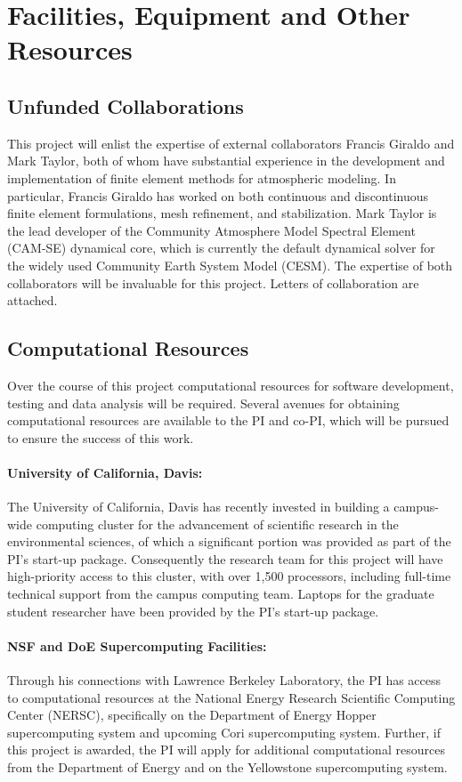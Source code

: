 \documentclass[11pt]{article}
\begin{document}
\appendix

\setcounter{section}{8}

\section{Facilities, Equipment and Other Resources}

\subsection{Unfunded Collaborations}

This project will enlist the expertise of external collaborators Francis Giraldo and Mark Taylor, both of whom have substantial experience in the development and implementation of finite element methods for atmospheric modeling.  In particular, Francis Giraldo has worked on both continuous and discontinuous finite element formulations, mesh refinement, and stabilization.  Mark Taylor is the lead developer of the Community Atmosphere Model Spectral Element (CAM-SE) dynamical core, which is currently the default dynamical solver for the widely used Community Earth System Model (CESM).  The expertise of both collaborators will be invaluable for this project.  Letters of collaboration are attached.

\subsection{Computational Resources}

Over the course of this project computational resources for software development, testing and data analysis will be required.  Several avenues for obtaining computational resources are available to the PI and co-PI, which will be pursued to ensure the success of this work.

\paragraph{University of California, Davis:} The University of California, Davis has recently invested in building a campus-wide computing cluster for the advancement of scientific research in the environmental sciences, of which a significant portion was provided as part of the PI's start-up package.  Consequently the research team for this project will have high-priority access to this cluster, with over 1,500 processors, including full-time technical support from the campus computing team.  Laptops for the  graduate student researcher have been provided by the PI's start-up package.

\paragraph{NSF and DoE Supercomputing Facilities:}  Through his connections with Lawrence Berkeley Laboratory, the PI has access to computational resources at the National Energy Research Scientific Computing Center (NERSC), specifically on the Department of Energy Hopper supercomputing system and upcoming Cori supercomputing system.  Further, if this project is awarded, the PI will apply for additional computational resources from the Department of Energy and on the Yellowstone supercomputing system.
\end{document}

